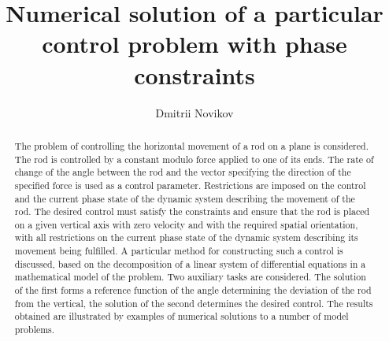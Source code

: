 \begin{englishtitle}
\title{Numerical solution of a particular control problem with phase constraints}
\author{Dmitrii Novikov
}

\maketitle

\begin{abstract}
The problem of controlling the horizontal movement of a rod on a plane is considered. The rod is controlled by a constant modulo force applied to one of its ends. The rate of change of the angle between the rod and the vector specifying the direction of the specified force is used as a control parameter. Restrictions are imposed on the control and the current phase state of the dynamic system describing the movement of the rod. The desired control must satisfy the constraints and ensure that the rod is placed on a given vertical axis with zero velocity and with the required spatial orientation, with all restrictions on the current phase state of the dynamic system describing its movement being fulfilled. A particular method for constructing such a control is discussed, based on the decomposition of a linear system of differential equations in a mathematical model of the problem. Two auxiliary tasks are considered. The solution of the first forms a reference function of the angle determining the deviation of the rod from the vertical, the solution of the second determines the desired control. The results obtained are illustrated by examples of numerical solutions to a number of model problems.

\end{abstract}
\end{englishtitle}

\iffalse
\documentclass[12pt]{llncs}
\usepackage[T2A]{fontenc}
\usepackage[utf8]{inputenc}
\usepackage[english,russian]{babel}
\usepackage[russian]{nla}


\fi

